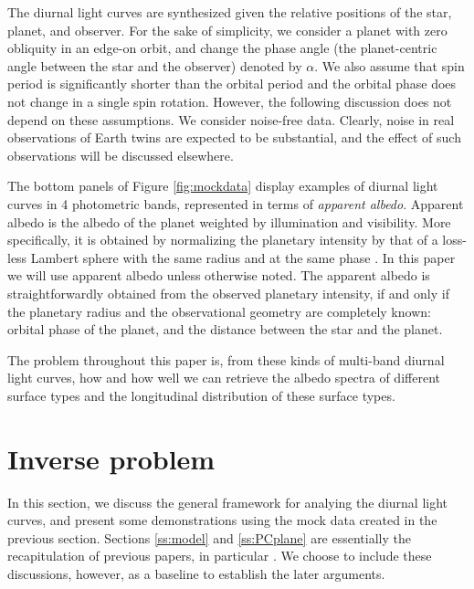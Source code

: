 \documentclass[iop,numberedappendix,apj]{emulateapj}
\def\memoJLY#1{\color{green}[JLY: {\bf #1}]\color{black}}
\begin{document}

The diurnal light curves are synthesized given the relative positions of the star, planet, and observer. 
For the sake of simplicity, we consider a planet with zero obliquity in an edge-on orbit, and change the phase angle (the planet-centric angle between the star and the observer) denoted by $\alpha $. 
We also assume that spin period is significantly shorter than the orbital period and the orbital phase does not change in a single spin rotation. 
However, the following discussion does not depend on these assumptions. 
We consider noise-free data. Clearly, noise in real observations of Earth twins are expected to be substantial, and the effect of such observations will be discussed elsewhere. 

The bottom panels of Figure \ref{fig:mockdata} display examples of diurnal light curves in 4 photometric bands, represented in terms of {\it apparent albedo}. 
Apparent albedo is the albedo of the planet weighted by illumination and visibility. 
More specifically, it is obtained by normalizing the planetary intensity by that of a loss-less Lambert sphere with the same radius and at the same phase \citep{Qiu2003, Seager2010}. 
In this paper we will use apparent albedo unless otherwise noted. 
The apparent albedo is straightforwardly obtained from the observed planetary intensity, if and only if the planetary radius and the observational geometry are completely known: orbital phase of the planet, and the distance between the star and the planet. 

The problem throughout this paper is, from these kinds of multi-band diurnal light curves, how and how well we can retrieve the albedo spectra of different surface types and the longitudinal distribution of these surface types. 


\section{Inverse problem}
\label{s:frame}

In this section, we discuss the general framework for analying the diurnal light curves, and present some demonstrations using the mock data created in the previous section. 
Sections \ref{ss:model} and \ref{ss:PCplane} are essentially the recapitulation of previous papers, in particular \citet{Cowan2013} \citep[but see also][]{Cowan2009,Cowan2011,Fujii2010,Fujii2011}.  
We choose to include these discussions, however, as a baseline to establish the later arguments. 
\end{document}
